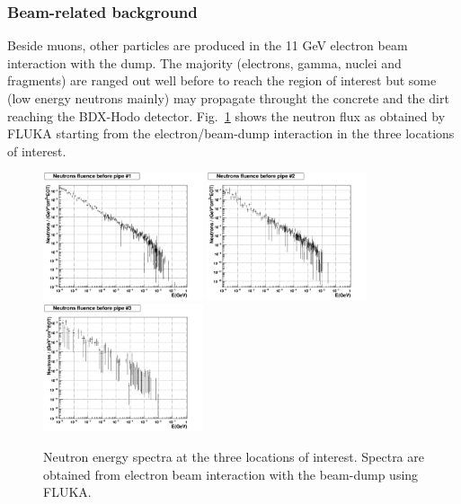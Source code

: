 \subsubsection{Beam-related background}
Beside muons, other particles are produced in the 11 GeV electron beam interaction with the dump.
The majority (electrons, gamma, nuclei and fragments) are ranged out well before to reach the region of interest but some (low energy neutrons mainly) may propagate throught the concrete and the dirt reaching the BDX-Hodo detector.
Fig.~\ref{fig:nu-comp} shows the neutron flux  as obtained by  FLUKA starting from the electron/beam-dump interaction  in the  three locations of interest. 
\begin{figure}[h!] 
\center
\includegraphics[width=4.7cm]{figs/NeutronsPipe1_1D.pdf}
\includegraphics[width=4.7cm]{figs/NeutronsPipe2_1D.pdf}
\includegraphics[width=4.7cm]{figs/NeutronsPipe3_1D.pdf}
\caption {Neutron energy spectra at the three locations of interest. Spectra are obtained from electron beam interaction with the beam-dump using FLUKA.}
\label{fig:nu-comp}
\end{figure}

